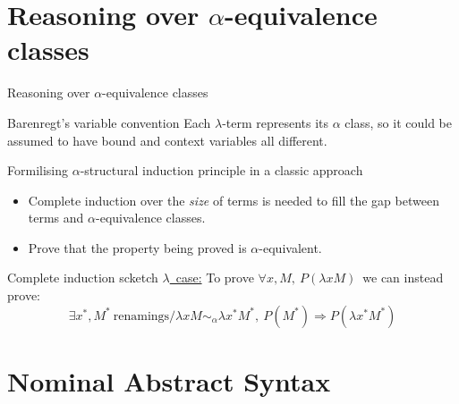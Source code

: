 \documentclass[utf,utf8x,hyperref=hidelinks,xcolor=table]{beamer}
\newcommand{\alphaeqsym}{\ensuremath{\sim_\alpha}}
\begin{document}
\section{Reasoning over $\alpha$-equivalence classes}

\begin{frame}{Reasoning over $\alpha$-equivalence classes}

  \begin{block}{Barenregt's variable convention}
    Each $\lambda$-term represents its $\alpha$ class, so it could be assumed to have bound and context variables all different.
  \end{block}

  \medskip
 \pause

  \begin{block}{Formilising $\alpha$-structural induction principle in a classic approach}
    \begin{itemize}
    \item Complete induction over the \emph{size} of terms is needed to fill the gap between terms and $\alpha$-equivalence classes.
    \item Prove that the property being proved is $\alpha$-equivalent.
    \end{itemize}
  \end{block}

  \smallskip
 \pause

  \begin{block}{Complete induction scketch}
     \underline{$\lambda$\ case:} To prove  $\forall x, M,\ P(\lambda x M)$\ we can instead prove:
             \[ \exists x^*, M^*\ \text{renamings} / \lambda x M \alphaeqsym \lambda x^* M^*,\ P(M^*) \Rightarrow P(\lambda x^* M^*)\]
     
     
  \end{block}

\end{frame}


\section{Nominal Abstract Syntax}
\end{document}
